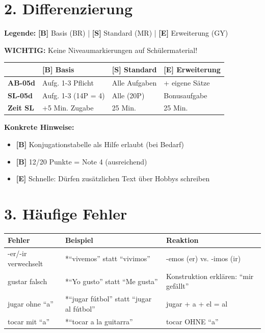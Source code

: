 \documentclass[11pt, a4paper]{article}
\newcommand{\B}{\textcolor{basis}{\textbf{[B]}}}
\newcommand{\Std}{\textcolor{standard}{\textbf{[S]}}}
\newcommand{\E}{\textcolor{erweiterung}{\textbf{[E]}}}
\begin{document}
\section*{2. Differenzierung}

\begin{differenzierung}
\textbf{Legende:} \B{} Basis (BR) | \Std{} Standard (MR) | \E{} Erweiterung (GY)

\textbf{WICHTIG:} Keine Niveaumarkierungen auf Schülermaterial!
\end{differenzierung}

\vspace{1em}

\begin{tabularx}{\textwidth}{|l|X|X|X|}
\hline
& \B{} \textbf{Basis} & \Std{} \textbf{Standard} & \E{} \textbf{Erweiterung} \\
\hline
\textbf{AB-05d} & Aufg. 1-3 Pflicht & Alle Aufgaben & + eigene Sätze \\
\hline
\textbf{SL-05d} & Aufg. 1-3 (14P = 4) & Alle (20P) & Bonusaufgabe \\
\hline
\textbf{Zeit SL} & +5 Min. Zugabe & 25 Min. & 25 Min. \\
\hline
\end{tabularx}

\vspace{1em}

\textbf{Konkrete Hinweise:}
\begin{itemize}
    \item \B{} Konjugationstabelle als Hilfe erlaubt (bei Bedarf)
    \item \B{} 12/20 Punkte = Note 4 (ausreichend)
    \item \E{} Schnelle: Dürfen zusätzlichen Text über Hobbys schreiben
\end{itemize}

\section*{3. Häufige Fehler}

\begin{fehlerbox}
\begin{tabularx}{\textwidth}{|l|X|X|}
\hline
\textbf{Fehler} & \textbf{Beispiel} & \textbf{Reaktion} \\
\hline
-er/-ir verwechselt & *``vivemos'' statt ``vivimos'' & -emos (er) vs. -imos (ir) \\
\hline
gustar falsch & *``Yo gusto'' statt ``Me gusta'' & Konstruktion erklären: ``mir gefällt'' \\
\hline
jugar ohne ``a'' & *``jugar fútbol'' statt ``jugar al fútbol'' & jugar + a + el = al \\
\hline
tocar mit ``a'' & *``tocar a la guitarra'' & tocar OHNE ``a'' \\
\hline
\end{tabularx}
\end{fehlerbox}
\end{document}
